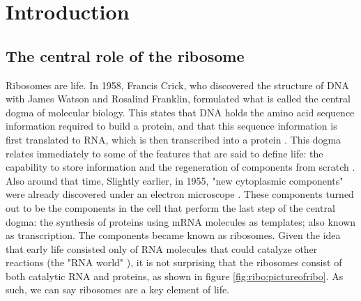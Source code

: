 
\section*{Introduction}

\subsection*{The central role of the ribosome}

Ribosomes are life.
%
In 1958, Francis Crick, who discovered the structure of DNA with James Watson and Rosalind Franklin,
formulated what is called the central dogma of molecular biology.
This states 
that DNA holds the amino acid sequence information required to build a protein, and that this sequence information is first translated to RNA, which is then transcribed into a protein \cite{Crick1958}.
% 
This dogma relates immediately to some of the features that are said to define life: 
the capability to store information and 
the regeneration of components from scratch \cite{Lawrence2005, Koshland2002}.
%
Also around that time, 
Slightly earlier, in 1955, "new cytoplasmic components" were already discovered under an electron microscope \cite{Palade1955}.
These components turned out to be the components in the cell that perform the last step of the central dogma: 
the synthesis of proteins using mRNA molecules as templates; also known as transcription.
The components became known as ribosomes.
%
Given the idea that early life consisted only of RNA molecules that could catalyze other reactions (the "RNA world" \cite{Campbell2002}), it is not surprising that the ribosomes 
consist of both catalytic RNA and proteins,
as shown in figure \ref{fig:ribo:pictureofribo}.
%
As such, we can say ribosomes are a key element of life.


